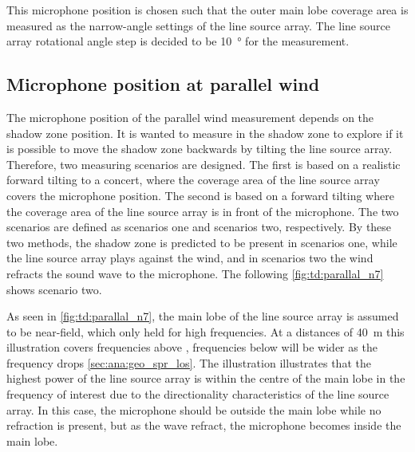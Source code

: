 
This microphone position is chosen such that the outer main lobe coverage area is measured as the narrow-angle settings of the line source array. The line source array rotational angle step is decided to be \SI{10}{\degree} for the measurement.


\subsection{Microphone position at parallel wind}\label{tops:mic_pos_par}
The microphone position of the parallel wind measurement depends on the shadow zone position. It is wanted to measure in the shadow zone to explore if it is possible to move the shadow zone backwards by tilting the line source array. Therefore, two measuring scenarios are designed.  The first is based on a realistic forward tilting to a concert, where the coverage area of the line source array covers the microphone position. The second is based on a forward tilting where the coverage area of the line source array is in front of the microphone. The two scenarios are defined as scenarios one and scenarios two, respectively.  By these two methods, the shadow zone is predicted to be present in scenarios one, while the line source array plays against the wind, and in scenarios two the wind refracts the sound wave to the microphone. The following \autoref{fig:td:parallal_n7} shows scenario two.


As seen in \autoref{fig:td:parallal_n7}, the main lobe of the line source array is assumed to be near-field, which only held for high frequencies. At a distances of \SI{40}{\meter} this illustration covers frequencies above , frequencies below will be wider as the frequency drops \autoref{sec:ana:geo_spr_los}. The illustration illustrates that the highest power of the line source array is within the centre of the main lobe in the frequency of interest due to the directionality characteristics of the line source array. In this case, the microphone should be outside the main lobe while no refraction is present, but as the wave refract, the microphone becomes inside the main lobe. 

